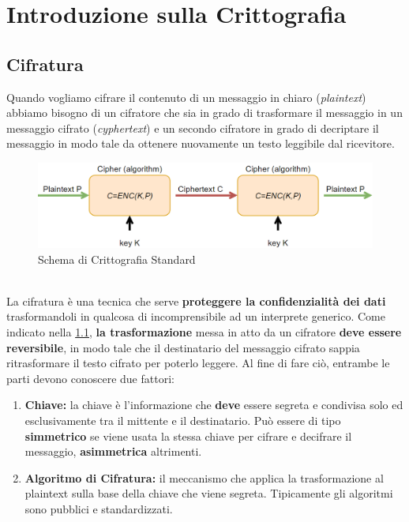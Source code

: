 \chapter{Introduzione sulla Crittografia}
\section{Cifratura}
Quando vogliamo cifrare il contenuto di un messaggio in chiaro (\emph{plaintext}) abbiamo bisogno di un cifratore che sia in grado di trasformare il messaggio in un messaggio cifrato (\emph{cyphertext}) e un secondo cifratore in grado di decriptare il messaggio in modo tale da ottenere nuovamente un testo leggibile dal ricevitore. 
\begin{figure}[h]
    \centering
    \includegraphics[width=\textwidth]{image/enc_exemple.png}
    \caption{Schema di Crittografia Standard}
    \label{fig:enc_exemple}
\end{figure}\\
La cifratura è una tecnica che serve \textbf{proteggere la confidenzialità dei dati} trasformandoli in qualcosa di incomprensibile ad un interprete generico. Come indicato nella \cref{fig:enc_exemple}, \textbf{la trasformazione} messa in atto da un cifratore \textbf{deve essere reversibile}, in modo tale che il destinatario del messaggio cifrato sappia ritrasformare il testo cifrato per poterlo leggere. Al fine di fare ciò, entrambe le parti devono conoscere due fattori:
\begin{enumerate}
    \item \textbf{Chiave:} la chiave è l'informazione che \textbf{deve} essere segreta e condivisa solo ed esclusivamente tra il mittente e il destinatario. Può essere di tipo \textbf{simmetrico} se viene usata la stessa chiave per cifrare e decifrare il messaggio, \textbf{asimmetrica} altrimenti. 
    \item \textbf{Algoritmo di Cifratura:} il meccanismo che applica la trasformazione al plaintext sulla base della chiave che viene segreta. Tipicamente gli algoritmi sono pubblici e standardizzati. 
\end{enumerate}
